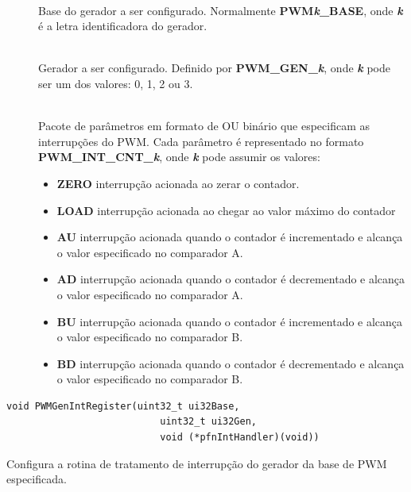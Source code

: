 \begin{description}
	\item []\hfill \\
	Base do gerador a ser configurado. Normalmente \textbf{PWM\emph{k}\_BASE}, onde \textbf{\emph{k}} é a letra identificadora do gerador.
	
	\item []\hfill \\
	Gerador a ser configurado. Definido por \textbf{PWM\_GEN\_\emph{k}}, onde \textbf{\emph{k}} pode ser um dos valores: 0, 1, 2 ou 3.
	
	\item []\hfill \\
	Pacote de parâmetros em formato de OU binário que especificam as interrupções do PWM. Cada parâmetro é representado no formato \textbf{PWM\_INT\_CNT\_\emph{k}}, onde \textbf{\emph{k}} pode assumir os valores:
	\begin{itemize}
		\item \textbf{ZERO} interrupção acionada ao zerar o contador.
		\item \textbf{LOAD} interrupção acionada ao chegar ao valor máximo do contador
		\item \textbf{AU} interrupção acionada quando o contador é incrementado e alcança o valor especificado no comparador A.
		\item \textbf{AD} interrupção acionada quando o contador é decrementado e alcança o valor especificado no comparador A.
		\item \textbf{BU} interrupção acionada quando o contador é incrementado e alcança o valor especificado no comparador B.
		\item \textbf{BD} interrupção acionada quando o contador é decrementado e alcança o valor especificado no comparador B.
	\end{itemize}
	
\end{description}

\begin{lstlisting}[style=funcao]
	void PWMGenIntRegister(uint32_t ui32Base,
						   uint32_t ui32Gen,
						   void (*pfnIntHandler)(void))
\end{lstlisting}

Configura a rotina de tratamento de interrupção do gerador da base de PWM especificada.


